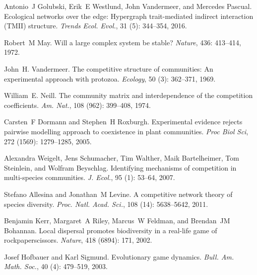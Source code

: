Antonio~J Golubski, Erik~E Westlund, John Vandermeer, and Mercedes Pascual.
\newblock Ecological networks over the edge: Hypergraph trait-mediated indirect
interaction ({{TMII}}) structure.
\newblock \emph{Trends Ecol. Evol.}, 31 (5): 344--354, 2016.

Robert~M May.
\newblock Will a large complex system be stable?
\newblock \emph{Nature}, 436: 413--414, 1972.

John~H. Vandermeer.
\newblock The competitive structure of communities: {{An}} experimental
approach with protozoa.
\newblock \emph{Ecology}, 50 (3): 362--371, 1969.

William~E. Neill.
\newblock The community matrix and interdependence of the competition
coefficients.
\newblock \emph{Am. Nat.}, 108 (962): 399--408, 1974.

Carsten~F Dormann and Stephen~H Roxburgh.
\newblock Experimental evidence rejects pairwise modelling approach to
coexistence in plant communities.
\newblock \emph{Proc Biol Sci}, 272 (1569): 1279--1285, 2005.

Alexandra Weigelt, Jens Schumacher, Tim Walther, Maik Bartelheimer, Tom
Steinlein, and Wolfram Beyschlag.
\newblock Identifying mechanisms of competition in multi-species communities.
\newblock \emph{J. Ecol.}, 95 (1): 53--64, 2007.

Stefano Allesina and Jonathan~M Levine.
\newblock A competitive network theory of species diversity.
\newblock \emph{Proc. Natl. Acad. Sci.}, 108 (14):
5638--5642, 2011.

Benjamin Kerr, Margaret~A Riley, Marcus~W Feldman, and Brendan~JM Bohannan.
\newblock Local dispersal promotes biodiversity in a real-life game of
rock\textendash{}paper\textendash{}scissors.
\newblock \emph{Nature}, 418 (6894): 171, 2002.

Josef Hofbauer and Karl Sigmund.
\newblock Evolutionary game dynamics.
\newblock \emph{Bull. Am. Math. Soc.}, 40 (4): 479--519,
2003.


